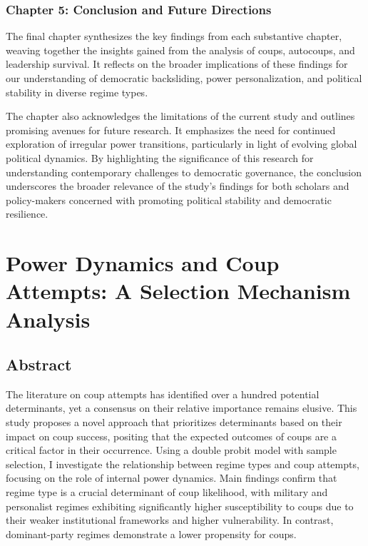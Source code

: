 \documentclass[
  12pt,
]{report}
\begin{document}
\subsection*{Chapter 5: Conclusion and Future
Directions}\label{chapter-5-conclusion-and-future-directions}

The final chapter synthesizes the key findings from each substantive
chapter, weaving together the insights gained from the analysis of
coups, autocoups, and leadership survival. It reflects on the broader
implications of these findings for our understanding of democratic
backsliding, power personalization, and political stability in diverse
regime types.

The chapter also acknowledges the limitations of the current study and
outlines promising avenues for future research. It emphasizes the need
for continued exploration of irregular power transitions, particularly
in light of evolving global political dynamics. By highlighting the
significance of this research for understanding contemporary challenges
to democratic governance, the conclusion underscores the broader
relevance of the study's findings for both scholars and policy-makers
concerned with promoting political stability and democratic resilience.

\chapter{Power Dynamics and Coup Attempts: A Selection Mechanism
Analysis}\label{sec-chapter2}

\section*{Abstract}\label{abstract-1}

The literature on coup attempts has identified over a hundred potential
determinants, yet a consensus on their relative importance remains
elusive. This study proposes a novel approach that prioritizes
determinants based on their impact on coup success, positing that the
expected outcomes of coups are a critical factor in their occurrence.
Using a double probit model with sample selection, I investigate the
relationship between regime types and coup attempts, focusing on the
role of internal power dynamics. Main findings confirm that regime type
is a crucial determinant of coup likelihood, with military and
personalist regimes exhibiting significantly higher susceptibility to
coups due to their weaker institutional frameworks and higher
vulnerability. In contrast, dominant-party regimes demonstrate a lower
propensity for coups.
\end{document}
